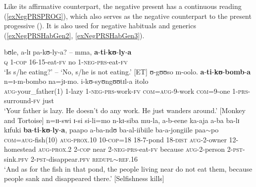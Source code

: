Like its affirmative counterpart, the negative present has a continuous reading (\ref{exNegPRSPROG}), which also serves as the negative counterpart to the present progessive (). It is also used for negative habituals and generics (\ref{exNegPRSHabGen2}, \ref{exNegPRSHabGen3}).
\begin{exe}
\ex \label{exNegPRSPROG} \gll bʊle, a-lɪ pa-kʊ-ly-a? -- mma, \textbf{a}-\textbf{ti}-\textbf{kʊ}-\textbf{ly}-\textbf{a}\\
\textsc{q} 1-\textsc{cop} 16-15-eat-\textsc{fv} {} no 1-\textsc{neg}-\textsc{prs}-eat-\textsc{fv}\\
\glt \lq Is s/he eating?' -- \lq No, s/he is not eating.' [ET]
\ex \label{exNegPRSHabGen2} \gll ʊ-gʊʊso m-oolo. \textbf{a}-\textbf{ti}-\textbf{kʊ}-\textbf{bomb}-\textbf{a} n=ɪ-m-bombo na=jɪ-mo. i-kʊ-syʊngʊʊtɪl-a itolo\\
\textsc{aug}-your\_father(1) 1-lazy 1-\textsc{neg}-\textsc{prs}-work-\textsc{fv} \textsc{com}=\textsc{aug}-9-work \textsc{com}=9-one 1-\textsc{prs}-surround-\textsc{fv} just\\
\glt `Your father is lazy. He doesn't do any work. He just wanders around.' [Monkey and Tortoise] 
\ex \label{exNegPRSHabGen3} \gll n=ɪɪ-swi ɪ-si si-li=mo n-kɪ-siba mu-la, a-b-eene ka-aja a-ba ba-lɪ kɪfuki \textbf{ba}-\textbf{ti}-\textbf{kʊ}-\textbf{ly}-\textbf{a}, paapo a-ba-ndʊ ba-al-iibiile ba-a-jongiile paa$\sim$po\\
\textsc{com}=\textsc{aug}-fish(10) \textsc{aug}-\textsc{prox.10} 10-\textsc{cop}=18 18-7-pond 18-\textsc{dist} \textsc{aug}-2-owner 12-homestead \textsc{aug}-\textsc{prox.2} 2-\textsc{cop} near 2-\textsc{neg}-\textsc{prs}-eat-\textsc{fv} because \textsc{aug}-2-person 2-\textsc{pst}-sink.\textsc{pfv} 2-\textsc{pst}-disappear.\textsc{pfv} \textsc{redupl}$\sim$\textsc{ref.16}\\ 
\glt `And as for the fish in that pond, the people living near do not eat them, because people sank and disappeared there.' [Selfishness kills]
\end{exe}

